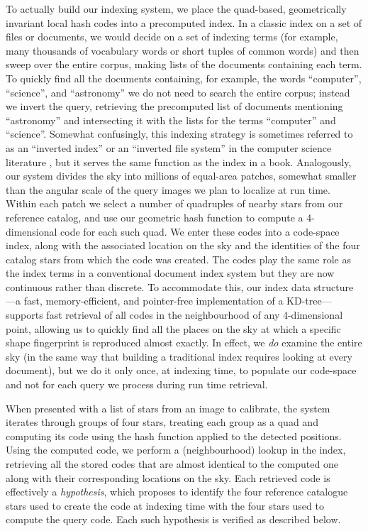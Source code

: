 \documentclass[12pt,preprint]{aastex}
\newcommand{\kdtree}{KD-tree}
\renewcommand{\%}{\percent}
\begin{document}
To actually build our indexing system, we place the quad-based,
geometrically invariant local hash codes into a precomputed index. In
a classic index on a set of files or documents, we would decide on a
set of indexing terms (for example, many thousands of vocabulary words
or short tuples of common words) and then sweep over the entire
corpus, making lists of the documents containing each term.  To
quickly find all the documents containing, for example, the words
``computer'', ``science'', and ``astronomy'' we do not need to search
the entire corpus; instead we invert the query, retrieving the
precomputed list of documents mentioning ``astronomy'' and
intersecting it with the lists for the terms ``computer'' and
``science''.  Somewhat confusingly, this indexing strategy is
sometimes referred to as an ``inverted index'' or an ``inverted file
system'' in the computer science literature \citep{invertedpaper}, but
it serves the same function as the index in a book.  Analogously,
our system divides the sky into millions of equal-area patches,
somewhat smaller than the angular scale of the query images we plan to
localize at run time. Within each patch we select a number of
quadruples of nearby stars from our reference catalog, and use our
geometric hash function to compute a 4-dimensional code for each such
quad.  We enter these codes into a code-space index, along with
the associated location on the sky and the identities of the four
catalog stars from which the code was created. The codes play the same
role as the index terms in a conventional document index system but
they are now continuous rather than discrete. To accommodate this, our
index data structure---a fast, memory-efficient, and pointer-free implementation
of a \kdtree \citep{lang08}---supports fast retrieval of all codes in the neighbourhood of
any 4-dimensional point, allowing us to quickly find all the places on
the sky at which a specific shape fingerprint is reproduced almost
exactly.  In effect, we \emph{do} examine the entire sky (in the same
way that building a traditional index requires looking at every
document), but we do it only once, at indexing time, to populate our
code-space and not for each query we process during run time
retrieval.

When presented with a list of stars from an image to calibrate, the
system iterates through groups of four stars, treating each group as a
quad and computing its code using the hash function applied to the
detected positions. Using the computed code, we perform a
(neighbourhood) lookup in the index, retrieving all the stored codes
that are almost identical to the computed one along with their
corresponding locations on the sky.  Each retrieved code is
effectively a \emph{hypothesis}, which proposes to identify the four
reference catalogue stars used to create the code at indexing time
with the four stars used to compute the query code. Each such
hypothesis is verified as described below.
\end{document}
